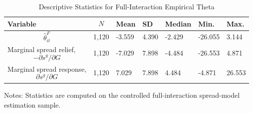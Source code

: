\begin{table}[H]\centering
\begin{threeparttable}
\caption{Descriptive Statistics for Full-Interaction Empirical Theta}
\label{tab:theta_descriptive_stats}
\scriptsize
\begin{tabularx}{\textwidth}{lYYYYYY}
\toprule
Variable & $$N$$ & Mean & SD & Median & Min. & Max. \\
\midrule
$$\widehat{\theta}^{F}_{it}$$ & 1,120 & -3.559 & 4.390 & -2.429 & -26.055 & 3.144 \\
Marginal spread relief, $$-\partial s^g/\partial G$$ & 1,120 & -7.029 & 7.898 & -4.484 & -26.553 & 4.871 \\
Marginal spread response, $$\partial s^g/\partial G$$ & 1,120 & 7.029 & 7.898 & 4.484 & -4.871 & 26.553 \\
\bottomrule
\end{tabularx}
\begin{tablenotes}[flushleft]\footnotesize
\item Notes: Statistics are computed on the controlled full-interaction spread-model estimation sample.
\end{tablenotes}
\end{threeparttable}
\end{table}
